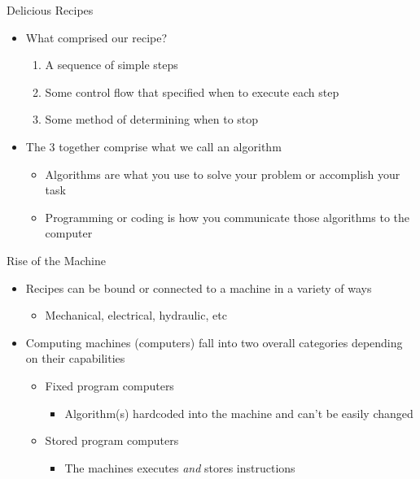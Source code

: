 \documentclass[pdf, aspectratio=169, 12pt]{beamer}
\begin{document}
\begin{frame}{Delicious Recipes}
	\begin{itemize}[<+->]
		\item What comprised our recipe?
			\begin{enumerate}
				\item A sequence of simple \alert{steps}
				\item Some \alert{control flow} that specified when to execute each step
				\item Some method of determining when to \alert{stop}
			\end{enumerate}
		\item The 3 together comprise what we call an \alert{algorithm}
			\begin{itemize}
				\item Algorithms are what you use to solve your problem or accomplish your task
				\item Programming or coding is how you communicate those algorithms to the computer
			\end{itemize}
	\end{itemize}
\end{frame}

\begin{frame}{Rise of the Machine}
	\begin{itemize}
		\item Recipes can be bound or connected to a machine in a variety of ways
			\begin{itemize}
				\item Mechanical, electrical, hydraulic, etc
			\end{itemize}
		\item Computing machines (computers) fall into two overall categories depending on their capabilities
			\begin{itemize}
				\item \alert{Fixed program} computers
					\begin{itemize}
						\item Algorithm(s) hardcoded into the machine and can't be easily changed
					\end{itemize}
				\item \alert{Stored program} computers
					\begin{itemize}
						\item The machines executes \emph{and} stores instructions
					\end{itemize}
			\end{itemize}
	\end{itemize}
\end{frame}
\end{document}
